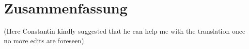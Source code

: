 \chapter*{Zusammenfassung}
(Here Constantin kindly suggested that he can help me with the translation once no more edits are foreseen)